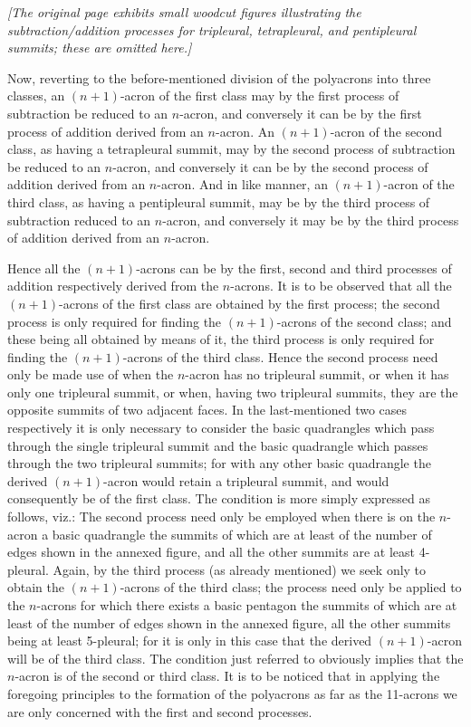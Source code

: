 \documentclass[11pt,a4paper]{article}
\begin{document}
\medskip

\noindent\textit{[The original page exhibits small woodcut figures illustrating the subtraction/addition processes for tripleural, tetrapleural, and pentipleural summits; these are omitted here.]}

\medskip

Now, reverting to the before-mentioned division of the polyacrons into three classes, an $(n+1)$-acron of the first class may by the first process of subtraction be reduced to an $n$-acron, and conversely it can be by the first process of addition derived from an $n$-acron. An $(n+1)$-acron of the second class, as having a tetrapleural summit, may by the second process of subtraction be reduced to an $n$-acron, and conversely it can be by the second process of addition derived from an $n$-acron. And in like manner, an $(n+1)$-acron of the third class, as having a pentipleural summit, may be by the third process of subtraction reduced to an $n$-acron, and conversely it may be by the third process of addition derived from an $n$-acron.

Hence all the $(n+1)$-acrons can be by the first, second and third processes of addition respectively derived from the $n$-acrons. It is to be observed that all the $(n+1)$-acrons of the first class are obtained by the first process; the second process is only required for finding the $(n+1)$-acrons of the second class; and these being all obtained by means of it, the third process is only required for finding the $(n+1)$-acrons of the third class. Hence the second process need only be made use of when the $n$-acron has no tripleural summit, or when it has only one tripleural summit, or when, having two tripleural summits, they are the opposite summits of two adjacent faces. In the last-mentioned two cases respectively it is only necessary to consider the basic quadrangles which pass through the single tripleural summit and the basic quadrangle which passes through the two tripleural summits; for with any other basic quadrangle the derived $(n+1)$-acron would retain a tripleural summit, and would consequently be of the first class. The condition is more simply expressed as follows, viz.: The second process need only be employed when there is on the $n$-acron a basic quadrangle the summits of which are at least of the number of edges shown in the annexed figure, and all the other summits are at least 4-pleural. Again, by the third process (as already mentioned) we seek only to obtain the $(n+1)$-acrons of the third class; the process need only be applied to the $n$-acrons for which there exists a basic pentagon the summits of which are at least of the number of edges shown in the annexed figure, all the other summits being at least 5-pleural; for it is only in this case that the derived $(n+1)$-acron will be of the third class. The condition just referred to obviously implies that the $n$-acron is of the second or third class. It is to be noticed that in applying the foregoing principles to the formation of the polyacrons as far as the 11-acrons we are only concerned with the first and second processes.
\end{document}
